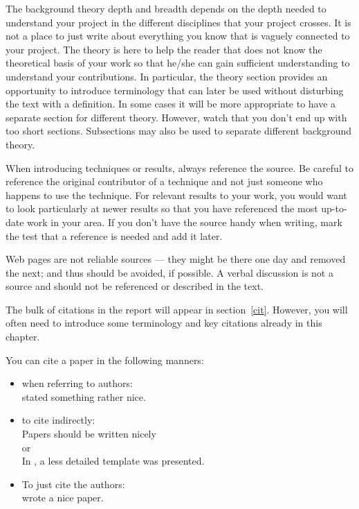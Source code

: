 \documentclass[a4paper]{book}
\begin{document}
The background theory depth and breadth depends on the depth needed to understand your project in the different disciplines that your project crosses.  It is not a place to just write about everything you know that is vaguely connected to your project. The theory is here to help the reader that does not know the theoretical basis of your work so that he/she can gain sufficient understanding to understand your contributions. In particular, the theory section provides an opportunity to introduce terminology that can later be used without disturbing the text with a definition.  In some cases it will be more appropriate to have a separate section for different theory. However, watch that you don't end up with too short sections. Subsections may also be used to separate different background theory. 

When introducing techniques or results, always reference the source. Be careful to reference the original contributor of a technique and not just someone who happens to use the technique. For relevant results to your work, you would want to look particularly at newer results so that you have referenced the most up-to-date work in your area. If you don't have the source handy when writing, mark the test that a reference is needed and add it later. 

Web pages are not reliable sources --- they might be there one day and removed the next; and thus should be avoided, if possible. A verbal discussion is not a source and should not be referenced or described in the text.  

The bulk of citations in the report will appear in section~\ref{cit}. However, you will often need to introduce some terminology and key citations already in this chapter. 

You can cite a paper in the following manners: 

\begin{itemize}
\item when referring to authors:\\
 \citet{authorson10:_secon_best_paper_in_world} stated something rather nice.
\item to cite indirectly: \\
 Papers should be written nicely \citep{authorson10:_secon_best_paper_in_world}\\
or\\
In \cite{authorson10:_secon_best_paper_in_world}, a less detailed template was presented.
\item To just cite the authors: \\
\citeauthor{authorson10:_secon_best_paper_in_world} wrote a nice paper.
\end{itemize}
\end{document}
